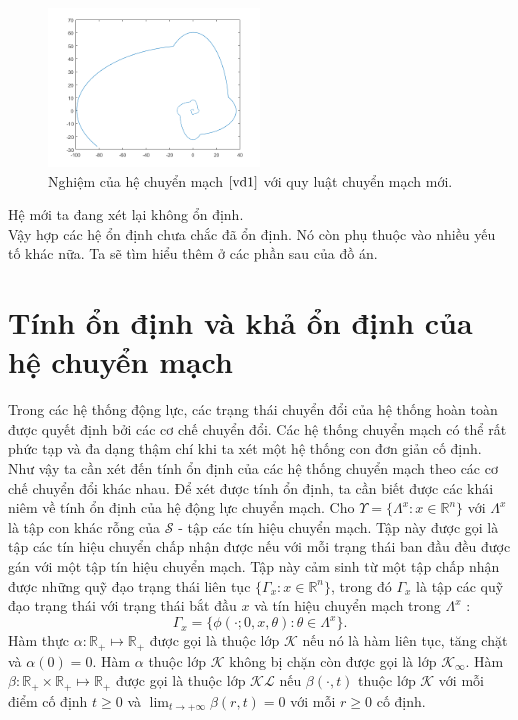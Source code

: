 \documentclass[14pt,a4paper,oneside]{report}		%
\theoremstyle{definition}
\begin{document}
\begin{figure}[h]
\centering
\includegraphics[width=0.5\textwidth]{graph10.png}
\caption{Nghiệm của hệ chuyển mạch $\ref{vd1}$ với quy luật chuyển mạch mới.}\label{fig:3}
\end{figure}
\newpage
Hệ mới ta đang xét lại không ổn định.\\

Vậy hợp các hệ ổn định chưa chắc đã ổn định. Nó còn phụ thuộc vào nhiều yếu tố khác nữa. Ta sẽ tìm hiểu thêm ở các phần sau của đồ án.
\section{Tính ổn định và khả ổn định của hệ chuyển mạch}
Trong các hệ thống động lực, các trạng thái chuyển đổi của hệ thống hoàn toàn được quyết định bởi các cơ chế chuyển đổi. Các hệ thống chuyển mạch có thể rất phức tạp và đa dạng thậm chí khi ta xét một hệ thống con đơn giản cố định. Như vậy ta cần xét đến tính ổn định của các hệ thống chuyển mạch theo các cơ chế chuyển đổi khác nhau. Để xét được tính ổn định, ta cần biết được các khái niêm về tính ổn định của hệ động lực chuyển mạch.
Cho $\Upsilon = \{\Lambda^x:x\in\mathbb{R}^n\}$ với $\Lambda^x$ là tập con khác rỗng của $\mathcal{S}$ - tập các tín hiệu chuyển mạch. Tập này được gọi là tập các tín hiệu chuyển chấp nhận được nếu với mỗi trạng thái ban đầu đều được gán với một tập tín hiệu chuyển mạch. Tập này cảm sinh từ một tập chấp nhận được những quỹ đạo trạng thái liên tục $\{\Gamma_x:x\in\mathbb{R}^n\}$, trong đó $\Gamma_x$ là tập các quỹ đạo trạng thái với trạng thái bắt đầu $x$ và tín hiệu chuyển mạch trong $\Lambda^x$ :
$$\Gamma_x = \{\phi(\cdot;0,x,\theta):\theta\in\Lambda^x\}.$$
Hàm thực $\alpha :\mathbb{R}_+ \mapsto \mathbb{R}_+$ được gọi là thuộc lớp $\mathcal{K}$ nếu nó là hàm liên tục, tăng chặt và $\alpha(0)=0$. Hàm $\alpha$ thuộc lớp $\mathcal{K}$ không bị chặn còn được gọi là lớp $\mathcal{K}_\infty$. Hàm $\beta : \mathbb{R}_+ \times \mathbb{R}_+ \mapsto \mathbb{R}_+$ được gọi là thuộc lớp $\mathcal{KL}$ nếu $\beta(\cdot,t)$ thuộc lớp $\mathcal{K}$ với mỗi điểm cố định $t \geq 0$ và $\lim_{t\rightarrow +\infty}\beta(r,t)=0$ với mỗi $r\geq 0$ cố định.
\end{document}
